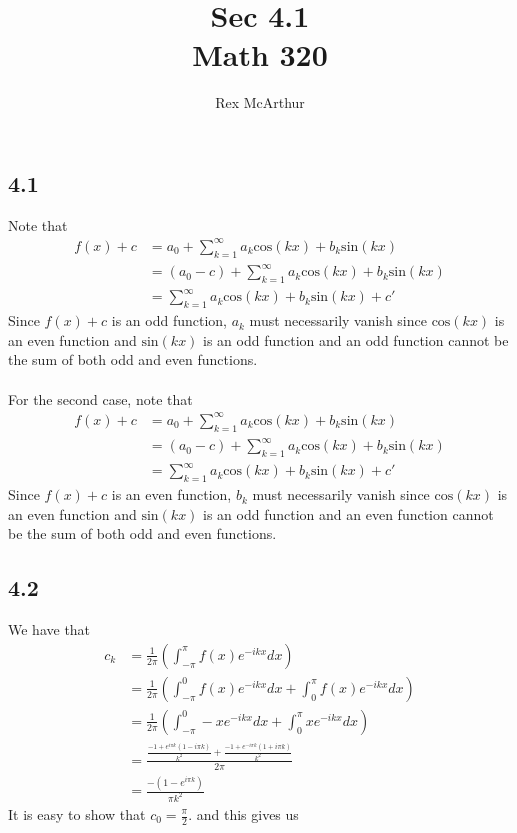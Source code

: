 \documentclass[letterpaper,12pt]{article}
\title{Sec 4.1 \\Math 320}
\author{Rex McArthur}
\theoremstyle{definition}
\begin{document}
\maketitle

\subsection*{4.1}
Note that
\begin{align*}
f(x) + c &= a_0  + \sum^{\infty}_{k=1} a_k \text{cos}(kx) + b_k \text{sin} (kx)\\
&= (a_0 - c)  + \sum^{\infty}_{k=1} a_k \text{cos}(kx) + b_k \text{sin} (kx)\\
&=  \sum^{\infty}_{k=1} a_k \text{cos}(kx) + b_k \text{sin} (kx)+ c'
\end{align*}
Since $f(x) + c$ is an odd function, $a_k$ must necessarily vanish since $\text{cos}(kx)$ is an even function and $\text{sin} (kx) $ is an odd function and an odd function cannot be the sum of both odd and even functions. \\\\

For the second case, note that
\begin{align*}
f(x) + c &= a_0  + \sum^{\infty}_{k=1} a_k \text{cos}(kx) + b_k \text{sin} (kx)\\
&= (a_0 - c)  + \sum^{\infty}_{k=1} a_k \text{cos}(kx) + b_k \text{sin} (kx)\\
&=  \sum^{\infty}_{k=1} a_k \text{cos}(kx) + b_k \text{sin} (kx)+ c'
\end{align*}
Since $f(x) + c$ is an even function, $b_k$ must necessarily vanish since $\text{cos}(kx)$ is an even function and $\text{sin} (kx) $ is an odd function and an even function cannot be the sum of both odd and even functions. 

\subsection*{4.2}
We have that
\begin{align*}
    c_k &= \frac{1}{2\pi} \left( \int^{\pi}_{-\pi} f(x)e^{-ikx}  dx \right)\\
    &= \frac{1}{2\pi} \left( \int^{0}_{-\pi} f(x)e^{-ikx}  dx + \int^{\pi}_{0} f(x)e^{-ikx}  dx \right)\\
    &= \frac{1}{2\pi} \left( \int^{0}_{-\pi} -x e^{-ikx}  dx + \int^{\pi}_{0} x e^{-ikx}  dx \right)\\
    &= \frac{\frac{-1+e^{i \pi k} (1-i \pi k)}{k^2}+\frac{-1+e^{-i \pi k} (1+i \pi k)}{k^2}}{2 \pi}\\
    &= \frac{-(1 - e^{i \pi k})}{\pi k^2}
\end{align*}
It is easy to show that $c_0 = \frac{\pi}{2}$. 
and this gives us 
\end{document}
